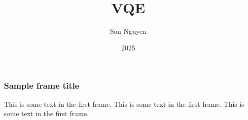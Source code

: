 \documentclass{beamer}
\title{VQE}
\author{Son Nguyen}
\institute{Overleaf}
\date{2025}
\begin{document}
\frame{\titlepage}

\begin{frame}
\frametitle{Sample frame title}
This is some text in the first frame. This is some text in the first frame. This is some text in the first frame.
\end{frame}
\end{document}
